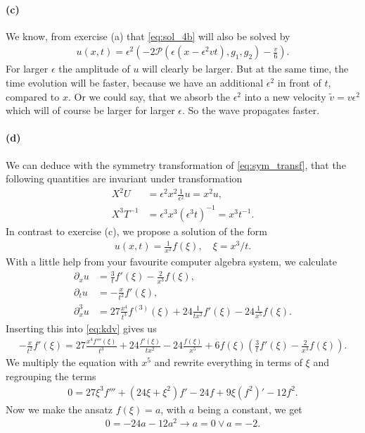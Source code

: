 \paragraph{(c)}
We know, from exercise (a) that \cref{eq:sol_4b} will also be solved by
\begin{align}
u(x,t)=\epsilon^2\left(-2\mathscr{P}(\epsilon\left( x-\epsilon^2v t\right), g_1,g_2)-\frac{v}{6}\right).
\end{align}
For larger $\epsilon$ the amplitude of $u$ will clearly be larger. But at the same time, the time evolution will be faster, because we have an additional $\epsilon^2$ in front of $t$, compared to $x$. Or we could say, that we absorb the $\epsilon^2$ into a new velocity $\tilde{v}=v\epsilon^2$ which will of course be larger for larger $\epsilon$. So the wave propagates faster. 
\paragraph{(d)}
We  can deduce with the symmetry transformation of \cref{eq:sym_transf}, that the following quantities are invariant under transformation
\begin{align}
X^2U&=\epsilon^2x^2\frac{1}{\epsilon^2} u = x^2u,\\
X^3T^{-1}&=\epsilon^3x^3(\epsilon^3t)^{-1}=x^3t^{-1}.
\end{align}
In contrast to exercise (c), we propose a solution of the form
\begin{align}
u(x,t) = \frac{1}{x^2}f(\xi),\quad \xi=x^3/t.
\end{align}
With a little help from your favourite computer algebra system, we calculate
\begin{align}
\partial_x u&=\frac 3t f'\left(\xi\right)-\frac{2}{x^3}f\left(\xi\right),\\
\partial_t u&=-\frac{x}{t^2}f'\left(\xi\right),\\
\partial^3_x u&=27 \frac{x^4}{t^3} f^{(3)}\left(\xi\right)+24\frac{1}{tx^2}f'\left(\xi\right)-24\frac{1}{x^5}f\left(\xi\right).
\end{align}
Inserting this into \cref{eq:kdv} gives us 
\begin{align}
-\frac{x}{t^2} f'(\xi)= 27\frac{x^4f'''(\xi)}{t^3} + 24 \frac{f'(\xi)}{tx^2} - 24 \frac{f(\xi)}{x^5} +6f(\xi)(\frac 3t f'(\xi)-\frac{2}{x^3}f(\xi)).
\end{align}
We multiply the equation with $x^5$ and rewrite everything in terms of $\xi$ and regrouping the terms
\begin{align}
0= 27 \xi^3 f''' + (24\xi+\xi^2) f' - 24 f + 9\xi(f^2)' - 12f^2.\label{eq:f_eq_d}
\end{align} 
Now we make the ansatz $f(\xi)=a$, with $a$ being a constant, we get
\begin{align}
0=-24a-12a^2
\rightarrow a=0 \vee a= -2.
\end{align}
